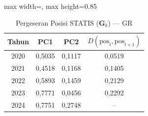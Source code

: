 \begin{table}[H]
\centering
\caption{Pergeseran Posisi STATIS ($\mathbf{G}_k$) --- GR} \label{tab:app1jarak_statis_loading_gr}
\begin{adjustbox}{max width=\textwidth, max height=0.85\textheight}
\begin{tabular}{|c|c|c|c|}
\hline
\textbf{Tahun} & \textbf{PC1} & \textbf{PC2} & \textbf{$D(\text{pos}_t, \text{pos}_{t+1})$} \\
\hline
2020 & 0,5035 & 0,1117 & 0,0519 \\
2021 & 0,4518 & 0,1168 & 0,1405 \\
2022 & 0,5893 & 0,1459 & 0,2129 \\
2023 & 0,7771 & 0,0456 & 0,2292 \\
2024 & 0,7751 & 0,2748 & -- \\
\hline
\end{tabular}
\end{adjustbox}
\end{table}